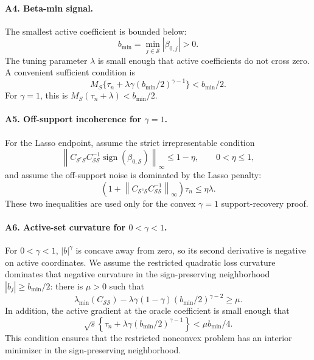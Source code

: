 \documentclass{article}
\begin{document}
\paragraph{A4. Beta-min signal.}
The smallest active coefficient is bounded below:
\begin{equation}
b_{\min}=\min_{j\in\mathcal S}|\beta_{0,j}|>0 .
\end{equation}
The tuning parameter \(\lambda\) is small enough that active coefficients do not cross zero. A convenient sufficient condition is
\begin{equation}
M_S\{\tau_n+\lambda\gamma(b_{\min}/2)^{\gamma-1}\}<b_{\min}/2 .
\label{eq:beta_min_lgamma_subnetwork}
\end{equation}
For \(\gamma=1\), this is \(M_S(\tau_n+\lambda)<b_{\min}/2\).

\paragraph{A5. Off-support incoherence for \(\gamma=1\).}
For the Lasso endpoint, assume the strict irrepresentable condition
\begin{equation}
\left\|
C_{\mathcal S^c\mathcal S}C_{\mathcal S\mathcal S}^{-1}
\operatorname{sign}(\beta_{0,\mathcal S})
\right\|_\infty
\le1-\eta,
\qquad 0<\eta\le1,
\label{eq:irrepresentable_lgamma_subnetwork}
\end{equation}
and assume the off-support noise is dominated by the Lasso penalty:
\begin{equation}
\left(1+\left\|C_{\mathcal S^c\mathcal S}C_{\mathcal S\mathcal S}^{-1}\right\|_\infty\right)\tau_n
\le \eta\lambda .
\label{eq:lasso_noise_dominance_lgamma}
\end{equation}
These two inequalities are used only for the convex \(\gamma=1\) support-recovery proof.

\paragraph{A6. Active-set curvature for \(0<\gamma<1\).}
For \(0<\gamma<1\), \(|b|^\gamma\) is concave away from zero, so its second derivative is negative on active coordinates. We assume the restricted quadratic loss curvature dominates that negative curvature in the sign-preserving neighborhood \(|b_j|\ge b_{\min}/2\): there is \(\mu>0\) such that
\begin{equation}
\lambda_{\min}(C_{\mathcal S\mathcal S})
-
\lambda\gamma(1-\gamma)(b_{\min}/2)^{\gamma-2}
\ge \mu .
\label{eq:active_curvature_lgamma_subnetwork}
\end{equation}
In addition, the active gradient at the oracle coefficient is small enough that
\begin{equation}
\sqrt{s}\left\{\tau_n+\lambda\gamma(b_{\min}/2)^{\gamma-1}\right\}<\mu b_{\min}/4 .
\label{eq:nonconvex_boundary_lgamma}
\end{equation}
This condition ensures that the restricted nonconvex problem has an interior minimizer in the sign-preserving neighborhood.
\end{document}
